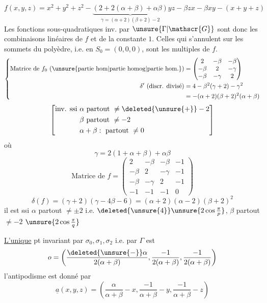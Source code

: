\[
f(x,y,z)=x^2+y^2+z^2-\underbrace{(2+2(\alpha+\beta)+\alpha\beta)}_{\gamma=(\alpha+2)(\beta+2)-2}yz-\beta zx-\beta xy-(x+y+z)
\]
Les fonctions sous-quadratiques inv. par $\unsure{\Gamma|\mathscr{G}}$ sont donc les combinaisons linéaires de $f$ et de la constante $1$. Celles qui s'annulent sur les sommets du polyèdre, i.e. en $S_0=(0,0,0)$, sont les multiples de $f$.
\[
\left\{\begin{aligned}
\text{Matrice de }f_0\ \text{(\unsure{partie hom|partie homog|partie hom.})}&=\begin{pmatrix}
2&-\beta&-\beta\\-\beta&2&-\gamma\\-\beta&-\gamma&2
\end{pmatrix}\\
\delta'\ (\text{discr. divisé})&=4-\beta^2(\gamma+2)-\gamma^2\\
&=-(\alpha+2)(\beta+2)^2(\alpha+\beta)
\end{aligned}\right.
\]
\[
\left[\begin{aligned}
\text{inv. ssi }&\alpha\text{ partout }\ne\deleted{\unsure{+}}-2\\
&\beta\text{ partout }\ne-2\\
&\alpha+\beta:\text{ partout }\ne0
\end{aligned}\right]
\]
où
\[
\gamma=2(1+\alpha+\beta)+\alpha\beta
\]
\[
\text{Matrice de }f=\begin{pmatrix}
2&-\beta&-\beta&-1\\
-\beta&2&-\gamma&-1\\
-\beta&-\gamma&2&-1\\
-1&-1&-1&0
\end{pmatrix}
\]
\[
\delta(f)=(\gamma+2)(\gamma-4\beta-6)=(\alpha+2)(\alpha-2)(\beta+2)^2
\]
\diagram{\begin{tikzcd}[ampersand replacement=\&]
{}\arrow[d,bend left=15]\\{}
\end{tikzcd}}
il est  ssi $\alpha$ partout $\ne\pm2$ i.e. $\deleted{\unsure{4}}\unsure{2\cos\frac{\pi}{p}}$, $\beta$ partout $\ne-2$ $\unsure{2\cos\frac{\pi}{q}}$

\uline{L'unique} pt invariant par $\sigma_0,\sigma_1,\sigma_2$ i.e. par $\Gamma$ est
\[
o=\left(\frac{\deleted{\unsure{-}}\alpha}{2(\alpha+\beta)},\frac{-1}{2(\alpha+\beta)},\frac{-1}{2(\alpha+\beta)}\right)
\]
l'antipodisme est donné par
\[
\underline{a}(x,y,z)=\left(\frac{\alpha}{\alpha+\beta}-x,\frac{-1}{\alpha+\beta}-y,\frac{-1}{\alpha+\beta}-z\right)
\]
